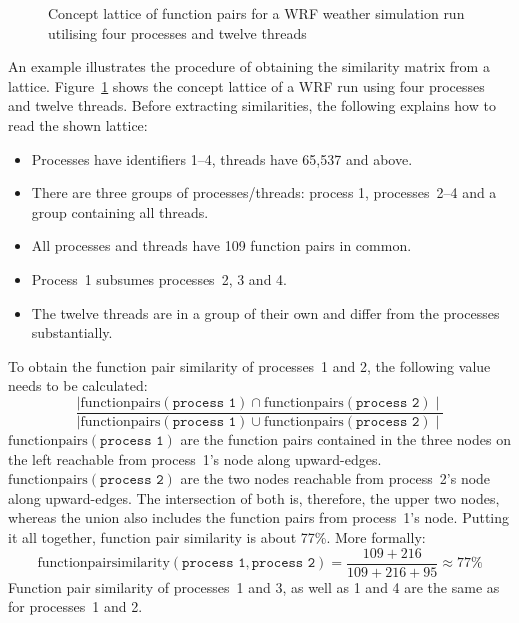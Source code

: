 \documentclass[a4paper, final, diplominf]{zih-template}
\begin{document}
\begin{figure}[t]
	\centering
	
	\vspace{0.5ex}
	\caption{Concept lattice of function pairs for a WRF weather simulation run utilising four processes and twelve threads}
	\label{fig:wrf-hybrid-16p-concept-lattice}
	\vspace{0.5ex}
\end{figure}
An example illustrates the procedure of obtaining the similarity matrix from a lattice.
Figure~\ref{fig:wrf-hybrid-16p-concept-lattice} shows the concept lattice of a WRF run using four processes and twelve threads.
Before extracting similarities, the following explains how to read the shown lattice:
\begin{itemize}
	\item Processes have identifiers 1--4, threads have 65,537 and above.\vspace{-0.5ex}
	\item There are three groups of processes/threads: process 1, processes~2--4 and a group containing all threads.\vspace{-0.5ex}
	\item All processes and threads have 109 function pairs in common.\vspace{-0.5ex}
	\item Process~1 subsumes processes~2, 3 and 4.\vspace{-0.5ex}
	\item The twelve threads are in a group of their own and differ from the processes substantially.
\end{itemize}
To obtain the function pair similarity of processes~1 and 2, the following value needs to be calculated:
\vspace{0.5ex}
\begin{equation*}
	\frac{ \mid \text{functionpairs}(\texttt{process 1}) \cap \text{functionpairs}(\texttt{process 2}) \mid }{ \mid \text{functionpairs}(\texttt{process 1}) \cup \text{functionpairs}(\texttt{process 2}) \mid }
\end{equation*}
$\text{functionpairs}(\texttt{process 1})$ are the function pairs contained in the three nodes on the left reachable from process~1's node along upward-edges.
$\text{functionpairs}(\texttt{process 2})$ are the two nodes reachable from process~2's node along upward-edges.
The intersection of both is, therefore, the upper two nodes, whereas the union also includes the function pairs from process~1's node.
Putting it all together, function pair similarity is about 77\%. More formally:
\begin{equation*}
	\text{functionpairsimilarity}(\texttt{process 1}, \texttt{process 2}) = \frac{109 + 216}{109 + 216 + 95} \approx 77\%
\end{equation*}
Function pair similarity of processes~1 and 3, as well as 1 and 4 are the same as for processes~1 and 2.
\end{document}
